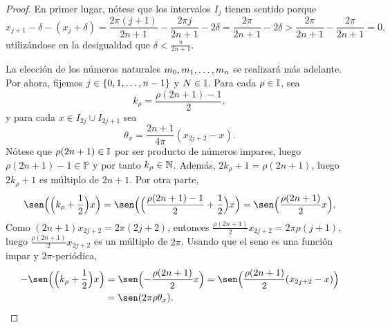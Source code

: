 \documentclass[a4paper, 12pt]{book}
\begin{document}
\begin{proof}
    En primer lugar, nótese que los intervalos $I_j$ tienen sentido porque
    \[x_{j+1}-\delta -(x_j+\delta) = \frac{2\pi(j+1)}{2n+1}-\frac{2\pi j}{2n+1} -2\delta = \frac{2\pi}{2n+1}-2\delta > \frac{2\pi}{2n+1}-\frac{2\pi}{2n+1} = 0,\]
    utilizándose en la desigualdad que $\delta < \frac{\pi}{2n+1}$.

    La elección de los números naturales $m_0,m_1,\mathellipsis,m_n$ se realizará más adelante. Por ahora, fijemos $j \in \{0,1,\mathellipsis,n-1\}$ y $N \in \mathbb I$. Para cada $\rho \in \mathbb I$, sea \[k_\rho = \frac{\rho(2n+1)-1}{2},\]
    y para cada $x \in I_{2j} \cup I_{2j+1}$ sea
    \[\theta_x = \frac{2n+1}{4\pi}(x_{2j+2}-x).\]
    Nótese que $\rho(2n+1) \in \mathbb I$ por ser producto de números impares, luego $\rho(2n+1)-1 \in \mathbb{P}$ y por tanto $k_\rho \in \mathbb N$. Además, $2k_\rho+1=\rho(2n+1)$, luego $2k_\rho+1$ es múltiplo de $2n+1$. Por otra parte,
    \[\sen\Bigl(\Bigl(k_\rho+\frac{1}{2}\Bigr)x\Bigr) = \sen\Bigl(\Bigl(\frac{\rho(2n+1)-1}{2}+\frac{1}{2}\Bigr)x\Bigr) = \sen\Bigl(\frac{\rho(2n+1)}{2}x\Bigr).\]
    Como $(2n+1)x_{2j+2} = 2\pi(2j+2)$, entonces $\frac{\rho(2n+1)}{2}x_{2j+2} = 2\pi\rho(j+1)$, luego $\frac{\rho(2n+1)}{2}x_{2j+2}$ es un múltiplo de $2\pi$. Usando que el seno es una función impar y $2\pi$-periódica,
    \begin{align}\label{2.2.10}
        -\sen\Bigl(\Bigl(k_\rho+\frac{1}{2}\Bigr)x\Bigr) &= \sen\Bigl(-\frac{\rho(2n+1)}{2}x\Bigr) = \sen\Bigl(\frac{\rho(2n+1)}{2}(x_{2j+2}-x)\Bigr) \notag \\ 
        &= \sen(2\pi \rho\theta_x).
    \end{align}
    

\end{proof}
\end{document}
